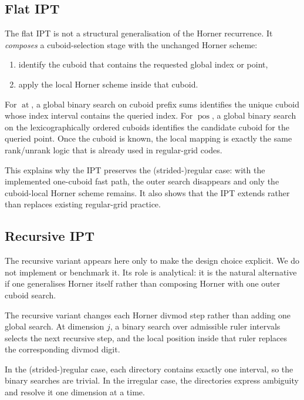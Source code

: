 \documentclass[manuscript,screen,review]{acmart}
\theoremstyle{definition}
\theoremstyle{plain}
\begin{document}
\subsection{Flat IPT}

The flat IPT is not a structural generalisation of the Horner recurrence. It \emph{composes}
a cuboid-selection stage with the unchanged Horner scheme:
\begin{enumerate}[leftmargin=*]
  \item identify the cuboid that contains the requested global index or point,
  \item apply the local Horner scheme inside that cuboid.
\end{enumerate}

For $\operatorname{at}$, a global binary search on cuboid prefix sums identifies the unique cuboid whose index interval contains the queried index. For $\operatorname{pos}$, a global binary search on the lexicographically ordered cuboids identifies the candidate cuboid for the queried point. Once the cuboid is known, the local mapping is exactly the same rank/unrank logic that is already used in regular-grid codes.

This explains why the IPT preserves the (strided-)regular case: with the implemented one-cuboid fast path, the outer search disappears and only the cuboid-local Horner scheme remains. It also shows that the IPT extends rather than replaces existing regular-grid practice.

\subsection{Recursive IPT}

The recursive variant appears here only to make the design choice
explicit. We do not implement or benchmark it. Its role is analytical:
it is the natural alternative if one generalises Horner itself rather
than composing Horner with one outer cuboid search.

The recursive variant changes each Horner divmod step rather than
adding one global search. At dimension $j$, a binary search over
admissible ruler intervals selects the next recursive step, and the
local position inside that ruler replaces the corresponding divmod
digit.

In the (strided-)regular case, each directory contains exactly one interval, so the binary searches are trivial. In the irregular case, the directories express ambiguity and resolve it one dimension at a time.
\end{document}
